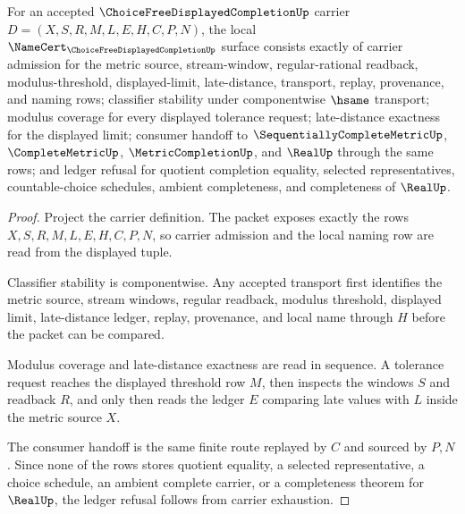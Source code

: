 \begin{theorem}
\label{thm:choice-free-displayed-completion-namecert-obligations}
For an accepted $\ChoiceFreeDisplayedCompletionUp$ carrier $D=(X,S,R,M,L,E,H,C,P,N)$, the local $\NameCert_{\ChoiceFreeDisplayedCompletionUp}$ surface consists exactly of carrier admission for the metric source, stream-window, regular-rational readback, modulus-threshold, displayed-limit, late-distance, transport, replay, provenance, and naming rows; classifier stability under componentwise $\hsame$ transport; modulus coverage for every displayed tolerance request; late-distance exactness for the displayed limit; consumer handoff to $\SequentiallyCompleteMetricUp$, $\CompleteMetricUp$, $\MetricCompletionUp$, and $\RealUp$ through the same rows; and ledger refusal for quotient completion equality, selected representatives, countable-choice schedules, ambient completeness, and completeness of $\RealUp$.
\end{theorem}
\begin{proof}
Project the carrier definition. The packet exposes exactly the rows $X,S,R,M,L,E,H,C,P,N$, so carrier admission and the local naming row are read from the displayed tuple.

Classifier stability is componentwise. Any accepted transport first identifies the metric source, stream windows, regular readback, modulus threshold, displayed limit, late-distance ledger, replay, provenance, and local name through $H$ before the packet can be compared.

Modulus coverage and late-distance exactness are read in sequence. A tolerance request reaches the displayed threshold row $M$, then inspects the windows $S$ and readback $R$, and only then reads the ledger $E$ comparing late values with $L$ inside the metric source $X$.

The consumer handoff is the same finite route replayed by $C$ and sourced by $P,N$. Since none of the rows stores quotient equality, a selected representative, a choice schedule, an ambient complete carrier, or a completeness theorem for $\RealUp$, the ledger refusal follows from carrier exhaustion.
\end{proof}


